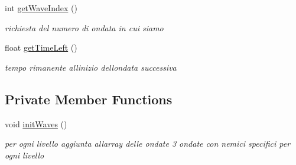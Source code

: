 \begin{DoxyCompactItemize}
int \hyperlink{classmanagers_1_1_wave_manager_a60286ee915faec2babdb0242b29fd90b}{get\+Wave\+Index} ()
\begin{DoxyCompactList}\small\item\em richiesta del numero di ondata in cui siamo \end{DoxyCompactList}\item 
float \hyperlink{classmanagers_1_1_wave_manager_a708aedb9bcf9177c5064192552091f66}{get\+Time\+Left} ()
\begin{DoxyCompactList}\small\item\em tempo rimanente all\textquotesingle{}inizio dell\textquotesingle{}ondata successiva \end{DoxyCompactList}\end{DoxyCompactItemize}
\subsection*{Private Member Functions}
\begin{DoxyCompactItemize}
\item 
void \hyperlink{classmanagers_1_1_wave_manager_a6df6e01cd643c513c52431c1a86819af}{init\+Waves} ()
\begin{DoxyCompactList}\small\item\em per ogni livello aggiunta all\textquotesingle{}array delle ondate 3 ondate con nemici specifici per ogni livello \end{DoxyCompactList}\end{DoxyCompactItemize}
